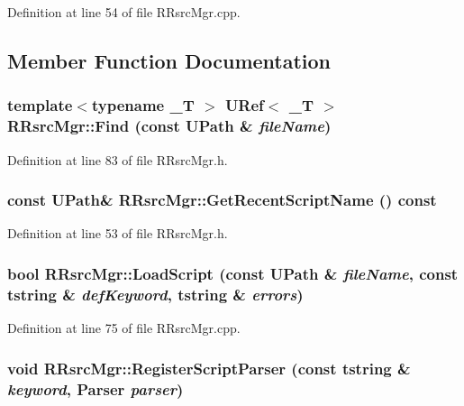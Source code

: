 Definition at line 54 of file RRsrcMgr.cpp.

\subsection{Member Function Documentation}
\hypertarget{class_r_rsrc_mgr_90e9653a560fc78a64f5799a420c155f}{
\subsubsection[{Find}]{\setlength{\rightskip}{0pt plus 5cm}template$<$typename \_\-T $>$ {\bf URef}$<$ \_\-T $>$ RRsrcMgr::Find (const {\bf UPath} \& {\em fileName})}}
\label{class_r_rsrc_mgr_90e9653a560fc78a64f5799a420c155f}




Definition at line 83 of file RRsrcMgr.h.\hypertarget{class_r_rsrc_mgr_a85d4b83e5e1fdbd0ced9f1299e93cdc}{
\subsubsection[{GetRecentScriptName}]{\setlength{\rightskip}{0pt plus 5cm}const {\bf UPath}\& RRsrcMgr::GetRecentScriptName () const}}
\label{class_r_rsrc_mgr_a85d4b83e5e1fdbd0ced9f1299e93cdc}




Definition at line 53 of file RRsrcMgr.h.\hypertarget{class_r_rsrc_mgr_bb72c237e1e5983a8e9b440849f4b66f}{
\subsubsection[{LoadScript}]{\setlength{\rightskip}{0pt plus 5cm}bool RRsrcMgr::LoadScript (const {\bf UPath} \& {\em fileName}, \/  const {\bf tstring} \& {\em defKeyword}, \/  {\bf tstring} \& {\em errors})}}
\label{class_r_rsrc_mgr_bb72c237e1e5983a8e9b440849f4b66f}




Definition at line 75 of file RRsrcMgr.cpp.\hypertarget{class_r_rsrc_mgr_6f9573818e19ea3c0510e7e29750968a}{
\subsubsection[{RegisterScriptParser}]{\setlength{\rightskip}{0pt plus 5cm}void RRsrcMgr::RegisterScriptParser (const {\bf tstring} \& {\em keyword}, \/  {\bf Parser} {\em parser})}}
\label{class_r_rsrc_mgr_6f9573818e19ea3c0510e7e29750968a}




